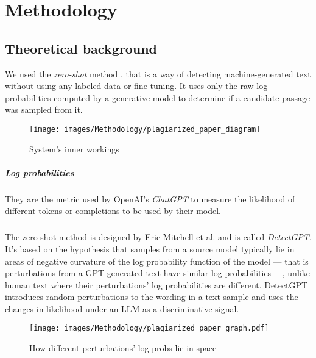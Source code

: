 \chapter{Methodology}
\label{chapter:meth}

\section{Theoretical background}

We used the \textit{zero-shot} method \cite{mitchell2023detectgpt}, that is  a way of detecting machine-generated text without using any labeled data or fine-tuning. It uses only the raw log probabilities computed by a generative model to determine if a candidate passage was sampled from it.

\begin{figure}[H]
	\centering
	\texttt{[image: images/Methodology/plagiarized\_paper\_diagram]}
	\caption{System's inner workings}
	\label{fig:plagiarizedpaperdiagram}
\end{figure}

\paragraph{Log probabilities}
They are the metric used by OpenAI's \textit{ChatGPT} to measure the likelihood of different tokens or completions to be used by their model.

\paragraph{}
The zero-shot method is designed by Eric Mitchell et al. and is called \textit{DetectGPT}. It's based on the hypothesis that samples from a source model typically lie in areas of negative curvature of the log probability function of the model --- that is perturbations from a  GPT-generated text   have similar log probabilities ---, unlike human text where their perturbations' log probabilities are different. DetectGPT introduces random perturbations to the wording in a text sample and uses the changes in likelihood under an LLM as a discriminative signal.

\begin{figure}[H]
	\centering
	\texttt{[image: images/Methodology/plagiarized\_paper\_graph.pdf]}
	\caption{How different perturbations' log probs lie in space}
	\label{fig:plagiarizedgraph}
\end{figure}

